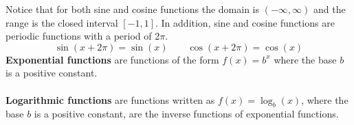 \begin{center}
\end{center}
Notice that for both sine and cosine functions the domain is \((-\infty, \infty)\) and the range is the closed interval \([-1, 1]\). In addition, sine and cosine functions are periodic functions with a period of 2\(\pi\). 
$$\sin(x+2\pi)=\sin(x) \quad \quad \cos(x+2\pi)=\cos(x)$$
\textbf{Exponential functions} are functions of the form \(f(x)=b^x\) where the base \(b\) is a positive constant.
\\\\
\textbf{Logarithmic functions} are functions written as \(f(x)=\log_b(x)\), where the base \(b\) is a positive constant, are the inverse functions of exponential functions.
